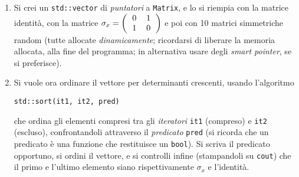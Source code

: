 \documentclass[12pt,italian]{article}
\begin{document}
\begin{enumerate}
\item
Si crei un {\tt std::vector} di \emph{puntatori} a {\tt Matrix},
e lo si riempia con la matrice identit\`a, con la matrice
{$\sigma_x=
\left(
\begin{tabular}{cc}
0&1\\
1&0
\end{tabular}
\right)$
}
e poi con 10 matrici simmetriche random
(tutte allocate \emph{dinamicamente}; ricordarsi di
liberare la memoria allocata, alla fine del programma;
in alternativa usare degli \emph{smart pointer}, se si preferisce).

%

\item
Si vuole ora ordinare il vettore per determinanti crescenti, usando l'algoritmo
\begin{lstlisting}
std::sort(it1, it2, pred)
\end{lstlisting}
che ordina gli elementi compresi tra gli \emph{iteratori} {\tt it1} (compreso)
e {\tt it2} (escluso), confrontandoli attraverso il \emph{predicato} {\tt pred}
(si ricorda che un predicato \`e una funzione che restituisce un {\tt bool}).
Si scriva il predicato opportuno, si ordini il vettore, e si controlli infine
(stampandoli su {\tt cout}) che
il primo e l'ultimo elemento siano rispettivamente $\sigma_x$ e l'identit\`a.

\end{enumerate}
\end{document}
